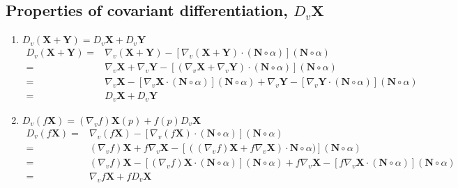 \subsection{Properties of covariant differentiation, $D_v \mathbf{X}$}
\begin{enumerate}
	\item $D_v (\mathbf{X} + \mathbf{Y}) = D_v \mathbf{X} + D_v \mathbf{Y}$
	\begin{align*}
		D_v (\mathbf{X} + \mathbf{Y}) = & \nabla_v (\mathbf{X} + \mathbf{Y}) - \left[ \nabla_v (\mathbf{X}+\mathbf{Y}) \cdot (\mathbf{N} \circ \alpha) \right] (\mathbf{N} \circ \alpha) \\
		= & \nabla_v \mathbf{X} + \nabla_v \mathbf{Y} - \left[ (\nabla_v \mathbf{X} + \nabla_v \mathbf{Y}) \cdot (\mathbf{N} \circ \alpha) \right] (\mathbf{N} \circ \alpha) \\
		= & \nabla_v \mathbf{X} - \left[ \nabla_v \mathbf{X} \cdot (\mathbf{N} \circ \alpha) \right] (\mathbf{N} \circ \alpha) +  \nabla_v \mathbf{Y} - \left[ \nabla_v \mathbf{Y} \cdot (\mathbf{N} \circ \alpha) \right] (\mathbf{N} \circ \alpha)  \\
		= & D_v \mathbf{X} + D_v \mathbf{Y}
	\end{align*}
	\item $D_v (f\mathbf{X}) = (\nabla_v f)\mathbf{X}(p) + f(p) D_v \mathbf{X}$ 
	\begin{align*}
		D_v(f\mathbf{X}) = & \nabla_v (f\mathbf{X}) - \left[ \nabla_v (f\mathbf{X}) \cdot (\mathbf{N} \circ \alpha) \right] (\mathbf{N} \circ \alpha) \\
		= & (\nabla_v f) \mathbf{X} + f\nabla_v \mathbf{X} - \left[ ((\nabla_v f) \mathbf{X} + f\nabla_v \mathbf{X}) \cdot \mathbf{N} \circ \alpha) \right] (\mathbf{N} \circ \alpha) \\
		= & (\nabla_v f) \mathbf{X} - \left[ (\nabla_v f)\mathbf{X} \cdot (\mathbf{N} \circ \alpha) \right] (\mathbf{N} \circ \alpha) + f \nabla_v \mathbf{X} - \left[ f\nabla_v\mathbf{X} \cdot (\mathbf{N} \circ \alpha) \right] (\mathbf{N} \circ \alpha) \\
		= & \nabla_v f \mathbf{X} + f D_v \mathbf{X}

\end{align*}
\end{enumerate}

